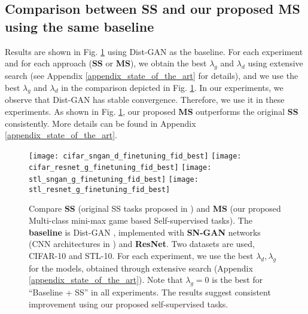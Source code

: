 \documentclass{article}
\begin{document}
\subsection{Comparison between {\bf SS} and our proposed {\bf MS} using the same baseline}
\label{compare_ss_ms}
Results are shown in 
Fig. \ref{ss_d_g_finetuning_all} using Dist-GAN \cite{tran-eccv-2018} as the baseline.
For each experiment and for each approach ({\bf SS} or {\bf MS}), 
we obtain the best $\lambda_g$ and $\lambda_d$ using extensive search (see Appendix \ref{appendix_state_of_the_art} for details), and we use the best $\lambda_g$ and $\lambda_d$ in the comparison depicted in Fig. \ref{ss_d_g_finetuning_all}. 
In our experiments, we observe that Dist-GAN has stable convergence. Therefore, we use it in these experiments. As shown in Fig. \ref{ss_d_g_finetuning_all}, our proposed {\bf MS} outperforms the original {\bf SS} consistently.
More details can be found in Appendix \ref{appendix_state_of_the_art}. 










\begin{figure}
  \centering
\texttt{[image: cifar\_sngan\_d\_finetuning\_fid\_best]}
  \texttt{[image: cifar\_resnet\_g\_finetuning\_fid\_best]}
  \texttt{[image: stl\_sngan\_g\_finetuning\_fid\_best]}
  \texttt{[image: stl\_resnet\_g\_finetuning\_fid\_best]}
\caption{Compare {\bf SS} (original SS tasks proposed in \cite{chen-arxiv-2018}) and {\bf MS} (our proposed Multi-class mini-max game based Self-supervised tasks). The {\bf baseline} is Dist-GAN \cite{tran-eccv-2018}, implemented with {\bf SN-GAN} networks (CNN architectures in \cite{miyato-iclr-2018}) and {\bf ResNet}. Two datasets are used, CIFAR-10 and STL-10. For each experiment, we use the best $\lambda_d, \lambda_g$ for the models, obtained through extensive search (Appendix \ref{appendix_state_of_the_art}). Note that $\lambda_g = 0$ is the best for ``Baseline + SS'' in all experiments. The results suggest consistent improvement using our proposed self-supervised tasks.
}
  \label{ss_d_g_finetuning_all}
\end{figure}
\end{document}

